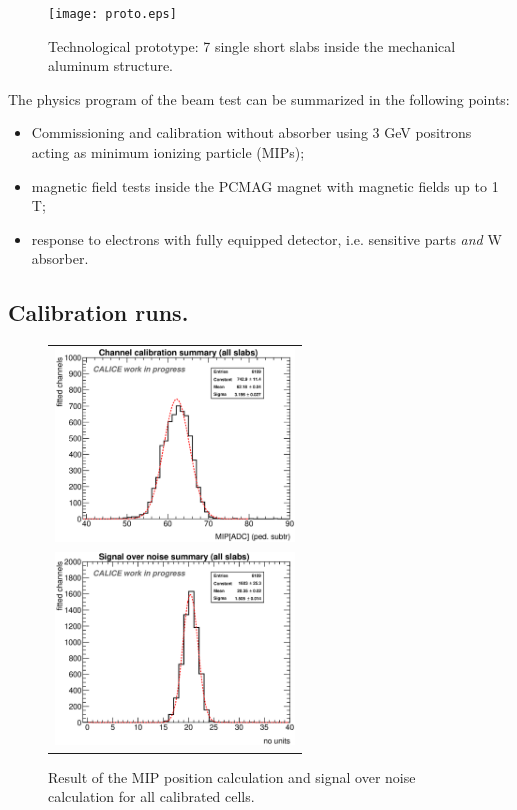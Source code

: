 \documentclass[journal]{IEEEtran}
\begin{document}

\begin{figure}[!t]
\centering
\texttt{[image: proto.eps]}
\caption{Technological prototype: 7 single short slabs inside the mechanical aluminum structure.}
\label{prototype}
\end{figure}

The physics program of the beam test can be summarized in the following points:

\begin{itemize}
\item Commissioning and calibration without absorber using 3 GeV positrons acting as minimum ionizing particle (MIPs);
\item magnetic field tests inside the PCMAG magnet with magnetic fields up to 1 T;
\item response to electrons with fully equipped detector, i.e. sensitive parts {\it and} W absorber.
\end{itemize}

\subsection{Calibration runs.}

\begin{figure}[!t]
  \centering
  \begin{tabular}{l}
    \includegraphics[width=2.5in]{mipsummary.eps}  \\
    \includegraphics[width=2.5in]{snsummary.eps}
  \end{tabular}
\caption{Result of the MIP position calculation and signal over noise calculation for all calibrated cells.}
\label{mipandSN}
\end{figure}
  
\end{document}
